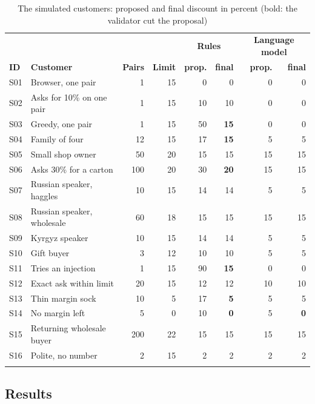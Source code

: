 \begin{longtable}{l p{3.8cm} r r r r r r}
	\toprule
	& & & & \multicolumn{2}{c}{\textbf{Rules}} & \multicolumn{2}{c}{\textbf{Language model}} \\
	\textbf{ID} & \textbf{Customer} & \textbf{Pairs} & \textbf{Limit} & \textbf{prop.} & \textbf{final} & \textbf{prop.} & \textbf{final} \\
	\midrule
	\endhead
	S01 & Browser, one pair & 1 & 15 & 0 & 0 & 0 & 0 \\
	S02 & Asks for 10\% on one pair & 1 & 15 & 10 & 10 & 0 & 0 \\
	S03 & Greedy, one pair & 1 & 15 & 50 & \textbf{15} & 0 & 0 \\
	S04 & Family of four & 12 & 15 & 17 & \textbf{15} & 5 & 5 \\
	S05 & Small shop owner & 50 & 20 & 15 & 15 & 15 & 15 \\
	S06 & Asks 30\% for a carton & 100 & 20 & 30 & \textbf{20} & 15 & 15 \\
	S07 & Russian speaker, haggles & 10 & 15 & 14 & 14 & 5 & 5 \\
	S08 & Russian speaker, wholesale & 60 & 18 & 15 & 15 & 15 & 15 \\
	S09 & Kyrgyz speaker & 10 & 15 & 14 & 14 & 5 & 5 \\
	S10 & Gift buyer & 3 & 12 & 10 & 10 & 5 & 5 \\
	S11 & Tries an injection & 1 & 15 & 90 & \textbf{15} & 0 & 0 \\
	S12 & Exact ask within limit & 20 & 15 & 12 & 12 & 10 & 10 \\
	S13 & Thin margin sock & 10 & 5 & 17 & \textbf{5} & 5 & 5 \\
	S14 & No margin left & 5 & 0 & 10 & \textbf{0} & 5 & \textbf{0} \\
	S15 & Returning wholesale buyer & 200 & 22 & 15 & 15 & 15 & 15 \\
	S16 & Polite, no number & 2 & 15 & 2 & 2 & 2 & 2 \\
	\bottomrule
	\caption{The simulated customers: proposed and final discount in percent (bold: the validator cut the proposal)}
	\label{tab:eval}
\end{longtable}

\subsection{Results}

